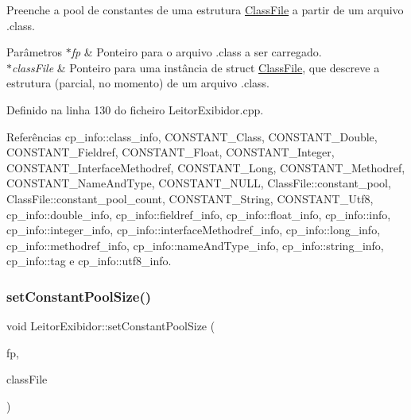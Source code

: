 Preenche a pool de constantes de uma estrutura \hyperlink{classClassFile}{Class\+File} a partir de um arquivo .class. 
\begin{DoxyParams}{Parâmetros}
{\em $\ast$fp} & Ponteiro para o arquivo .class a ser carregado. \\
\hline
{\em $\ast$class\+File} & Ponteiro para uma instância de struct \hyperlink{classClassFile}{Class\+File}, que descreve a estrutura (parcial, no momento) de um arquivo .class. \\
\hline
\end{DoxyParams}


Definido na linha 130 do ficheiro Leitor\+Exibidor.\+cpp.



Referências cp\+\_\+info\+::class\+\_\+info, C\+O\+N\+S\+T\+A\+N\+T\+\_\+\+Class, C\+O\+N\+S\+T\+A\+N\+T\+\_\+\+Double, C\+O\+N\+S\+T\+A\+N\+T\+\_\+\+Fieldref, C\+O\+N\+S\+T\+A\+N\+T\+\_\+\+Float, C\+O\+N\+S\+T\+A\+N\+T\+\_\+\+Integer, C\+O\+N\+S\+T\+A\+N\+T\+\_\+\+Interface\+Methodref, C\+O\+N\+S\+T\+A\+N\+T\+\_\+\+Long, C\+O\+N\+S\+T\+A\+N\+T\+\_\+\+Methodref, C\+O\+N\+S\+T\+A\+N\+T\+\_\+\+Name\+And\+Type, C\+O\+N\+S\+T\+A\+N\+T\+\_\+\+N\+U\+LL, Class\+File\+::constant\+\_\+pool, Class\+File\+::constant\+\_\+pool\+\_\+count, C\+O\+N\+S\+T\+A\+N\+T\+\_\+\+String, C\+O\+N\+S\+T\+A\+N\+T\+\_\+\+Utf8, cp\+\_\+info\+::double\+\_\+info, cp\+\_\+info\+::fieldref\+\_\+info, cp\+\_\+info\+::float\+\_\+info, cp\+\_\+info\+::info, cp\+\_\+info\+::integer\+\_\+info, cp\+\_\+info\+::interface\+Methodref\+\_\+info, cp\+\_\+info\+::long\+\_\+info, cp\+\_\+info\+::methodref\+\_\+info, cp\+\_\+info\+::name\+And\+Type\+\_\+info, cp\+\_\+info\+::string\+\_\+info, cp\+\_\+info\+::tag e cp\+\_\+info\+::utf8\+\_\+info.

\mbox{\label{classLeitorExibidor_a13b5c2cf5de57b6cea330a425f7e55be}} 
\subsubsection{\texorpdfstring{set\+Constant\+Pool\+Size()}{setConstantPoolSize()}}
{\footnotesize\ttfamily void Leitor\+Exibidor\+::set\+Constant\+Pool\+Size (\begin{DoxyParamCaption}\item[{F\+I\+LE $\ast$}]{fp,  }\item[{\hyperlink{classClassFile}{Class\+File} $\ast$}]{class\+File }\end{DoxyParamCaption})\hspace{0.3cm}{\ttfamily [private]}}

